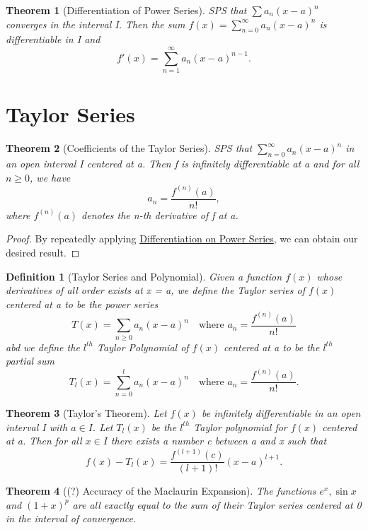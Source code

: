 \documentclass[11pt, oneside]{book}
\theoremstyle{break}
\newtheorem{thm}{Theorem}[section]
\newtheorem*{proof}{Proof}
\newtheorem{defn}{Definition}[section]
\begin{document}
\begin{thm}[Differentiation of Power Series]\label{power_series_differentiation}
	SPS that $\sum a_n (x-a)^n$ converges in the interval I. Then the sum $f(x) = \sum_{n=0}^{\infty} a_n (x-a)^n$ is differentiable in I and
	\[
		f'(x) = \sum_{n=1}^{\infty} a_n (x-a)^{n-1}.
	\]
\end{thm}


\section{Taylor Series}

\begin{thm}[Coefficients of the Taylor Series]
	SPS that $\sum_{n=0}^{\infty} a_n (x-a)^n$ in an open interval I centered at a. Then f is infinitely differentiable at a and for all $n \geq 0$, we have
	\[
		a_n = \frac{f^{(n)} (a)}{n!}, 
	\]
	where $f^{(n)}(a)$ denotes the n-th derivative of f at a.
\end{thm}

\begin{proof}
	By repeatedly applying \hyperref[power_series_differentiation]{Differentiation on Power Series}, we can obtain our desired result.
\end{proof}

\begin{defn}[Taylor Series and Polynomial]
	Given a function $f(x)$ whose derivatives of all order exists at x = a, we define the Taylor series of $f(x)$ centered at a to be the power series
	\[
		T(x) = \sum_{n \geq 0} a_n (x-a)^n \quad \text{where } a_n = \frac{f^{(n)}(a)}{n!} 
	\]
	abd we define the $l^{th}$ Taylor Polynomial of $f(x)$ centered at a to be the $l^{th}$ partial sum
	\[
		T_l(x) = \sum_{n=0}^{l} a_n (x-a)^n \quad \text{where } a_n = \frac{f^{(n)}(a)}{n!}.
	\]
\end{defn}

\begin{thm}[Taylor's Theorem]
	Let $f(x)$ be infinitely differentiable in an open interval I with $a \in I$. Let $T_l(x)$ be the $l^{th}$ Taylor polynomial for $f(x)$ centered at a. Then for all $x \in I$ there exists a number c between a and x such that
	\[
		f(x) - T_l(x) = \frac{f^{(l + 1)}(c)}{(l + 1)!} (x-a)^{l+1}. 
	\]
\end{thm}

\begin{thm}[(?) Accuracy of the Maclaurin Expansion]
	The functions $e^x, \sin x$ and $(1+x)^p$ are all exactly equal to the sum of their Taylor series centered at 0 in the interval of convergence.
\end{thm}
\end{document}
